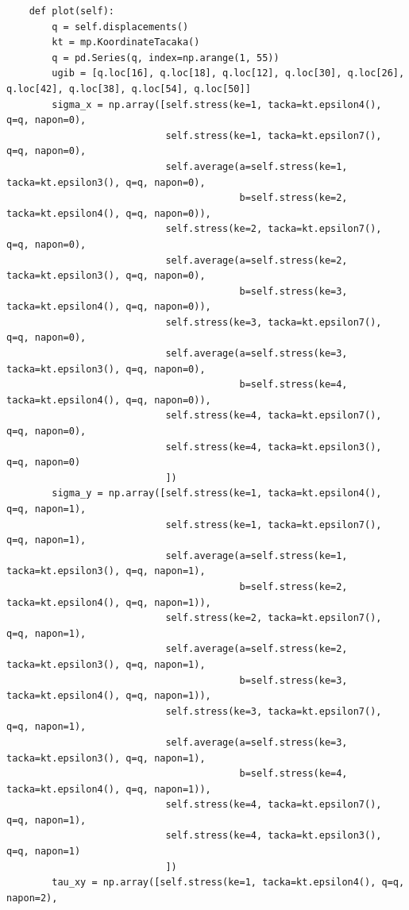 \documentclass[11pt, a4paper]{article}
\begin{document}
\begin{lstlisting}
    def plot(self):
        q = self.displacements()
        kt = mp.KoordinateTacaka()
        q = pd.Series(q, index=np.arange(1, 55))
        ugib = [q.loc[16], q.loc[18], q.loc[12], q.loc[30], q.loc[26], q.loc[42], q.loc[38], q.loc[54], q.loc[50]]
        sigma_x = np.array([self.stress(ke=1, tacka=kt.epsilon4(), q=q, napon=0),
                            self.stress(ke=1, tacka=kt.epsilon7(), q=q, napon=0),
                            self.average(a=self.stress(ke=1, tacka=kt.epsilon3(), q=q, napon=0),
                                         b=self.stress(ke=2, tacka=kt.epsilon4(), q=q, napon=0)),
                            self.stress(ke=2, tacka=kt.epsilon7(), q=q, napon=0),
                            self.average(a=self.stress(ke=2, tacka=kt.epsilon3(), q=q, napon=0),
                                         b=self.stress(ke=3, tacka=kt.epsilon4(), q=q, napon=0)),
                            self.stress(ke=3, tacka=kt.epsilon7(), q=q, napon=0),
                            self.average(a=self.stress(ke=3, tacka=kt.epsilon3(), q=q, napon=0),
                                         b=self.stress(ke=4, tacka=kt.epsilon4(), q=q, napon=0)),
                            self.stress(ke=4, tacka=kt.epsilon7(), q=q, napon=0),
                            self.stress(ke=4, tacka=kt.epsilon3(), q=q, napon=0)
                            ])
        sigma_y = np.array([self.stress(ke=1, tacka=kt.epsilon4(), q=q, napon=1),
                            self.stress(ke=1, tacka=kt.epsilon7(), q=q, napon=1),
                            self.average(a=self.stress(ke=1, tacka=kt.epsilon3(), q=q, napon=1),
                                         b=self.stress(ke=2, tacka=kt.epsilon4(), q=q, napon=1)),
                            self.stress(ke=2, tacka=kt.epsilon7(), q=q, napon=1),
                            self.average(a=self.stress(ke=2, tacka=kt.epsilon3(), q=q, napon=1),
                                         b=self.stress(ke=3, tacka=kt.epsilon4(), q=q, napon=1)),
                            self.stress(ke=3, tacka=kt.epsilon7(), q=q, napon=1),
                            self.average(a=self.stress(ke=3, tacka=kt.epsilon3(), q=q, napon=1),
                                         b=self.stress(ke=4, tacka=kt.epsilon4(), q=q, napon=1)),
                            self.stress(ke=4, tacka=kt.epsilon7(), q=q, napon=1),
                            self.stress(ke=4, tacka=kt.epsilon3(), q=q, napon=1)
                            ])
        tau_xy = np.array([self.stress(ke=1, tacka=kt.epsilon4(), q=q, napon=2),

\end{lstlisting}
\end{document}
